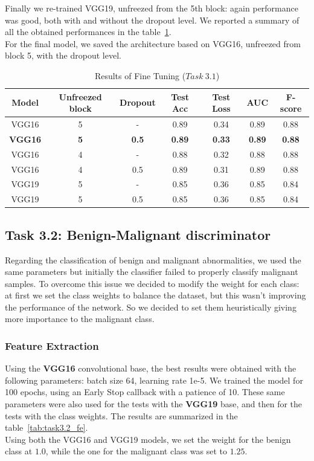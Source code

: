 \documentclass[11pt,a4paper,oneside]{article}
\begin{document}
Finally we re-trained VGG19, unfreezed from the 5th block: again performance was good, both with and without the dropout level. We reported a summary of all the obtained performances in the table~\ref{tab:task3.1_ft}. \\

For the final model, we saved the architecture based on VGG16, unfreezed from block 5, with the dropout level.

\clearpage

\begin{table}[h]
\centering
\begin{tabular}{|ccc|cccc|}
\hline
Model & Unfreezed block & Dropout & Test Acc & Test Loss & AUC & F-score \\
\hline
VGG16 & 5 & -   & 0.89 & 0.34 & 0.89 & 0.88 \\
\textbf{VGG16} & \textbf{5} & \textbf{0.5} & \textbf{0.89} & \textbf{0.33} & \textbf{0.89} & \textbf{0.88} \\
VGG16 & 4 & -   & 0.88 & 0.32 & 0.88 & 0.88 \\
VGG16 & 4 & 0.5 & 0.89 & 0.31 & 0.89 & 0.88 \\
VGG19 & 5 & -   & 0.85 & 0.36 & 0.85 & 0.84 \\
VGG19 & 5 & 0.5 & 0.85 & 0.36 & 0.85 & 0.84 \\
\hline
\end{tabular}
\caption{Results of Fine Tuning ($Task\ 3.1$)}
\label{tab:task3.1_ft}
\end{table}


\subsection{Task 3.2: Benign-Malignant discriminator}
Regarding the classification of benign and malignant abnormalities, we used the same parameters but initially the classifier failed to properly classify malignant samples. To overcome this issue we decided to modify the weight for each class: at first we set the class weights to balance the dataset, but this wasn't improving the performance of the network. So we decided to set them heuristically giving more importance to the malignant class. 

\subsubsection{Feature Extraction}
Using the \textbf{VGG16} convolutional base, the best results were obtained with the following parameters: batch size 64, learning rate 1e-5. We trained the model for 100 epochs, using an Early Stop callback with a patience of 10. These same parameters were also used for the tests with the \textbf{VGG19} base, and then for the tests with the class weights. The results are summarized in the table~\ref{tab:task3.2_fe}. \\
Using both the VGG16 and VGG19 models, we set the weight for the benign class at $1.0$, while the one for the malignant class was set to $1.25$.
\end{document}
